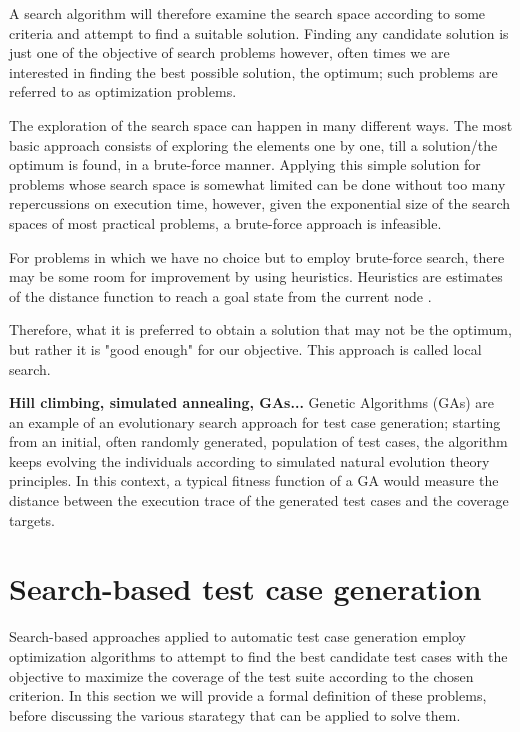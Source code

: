 A search algorithm will therefore examine the search space according to some criteria and attempt to find a suitable solution. Finding any candidate solution is just one of the objective of search problems however, often times we are interested in finding the best possible solution, the optimum; such problems are referred to as optimization problems.

The exploration of the search space can happen in many different ways. The most basic approach consists of exploring the elements one by one, till a solution/the optimum is found, in a brute-force manner. Applying this simple solution for problems whose search space is somewhat limited can be done without too many repercussions on execution time, however, given the exponential size of the search spaces of most practical problems, a brute-force approach is infeasible. 

For problems in which we have no choice but to employ brute-force search, there may be some room for improvement by using heuristics. Heuristics are estimates of the distance function to reach a goal state from the current node \cite{HeuristicSearch}.


Therefore, what it is preferred to obtain a solution that may not be the optimum, but rather it is "good enough" for our objective. This approach is called local search.

 
\textbf{Hill climbing, simulated annealing, GAs...}
Genetic Algorithms (GAs) are an example of an
evolutionary search approach for test case generation; starting from an initial, often randomly generated, population of 
test cases, the algorithm keeps evolving the individuals according to simulated natural evolution theory principles.
In this context, a typical fitness function of a GA would measure the distance between the execution trace of the generated test cases
and the coverage targets.





\newpage
\section{Search-based test case generation}
Search-based approaches applied to automatic test case generation employ optimization algorithms to attempt to find the best candidate test cases with the objective to maximize the coverage of the test suite according to the chosen criterion. 
In this section we will provide a formal definition of these problems, before discussing the various starategy that can be applied to solve them.


